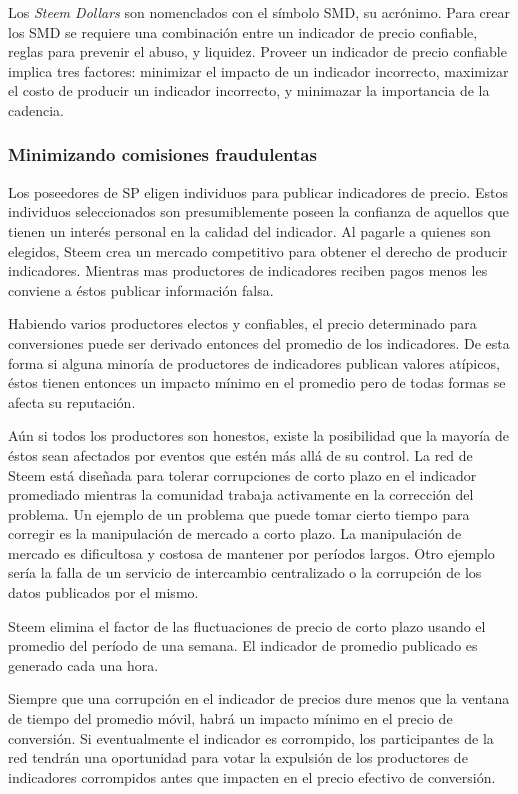 \documentclass[a4paper,titlepage,final]{article}
\begin{document}
Los \textit{Steem Dollars} son nomenclados con el símbolo SMD, su acrónimo. Para crear los SMD se requiere una combinación entre un indicador de precio confiable, reglas para prevenir el abuso, y liquidez. Proveer un indicador de precio confiable implica tres factores: minimizar el impacto de un indicador incorrecto, maximizar el costo de producir un indicador incorrecto, y minimazar la importancia de la cadencia.

\subsubsection{Minimizando comisiones fraudulentas}

Los poseedores de SP eligen individuos para publicar indicadores de precio. Estos individuos seleccionados son presumiblemente poseen la confianza de aquellos que tienen un interés personal en la calidad del indicador. Al pagarle a quienes son elegidos, Steem crea un mercado competitivo para obtener el derecho de producir indicadores. Mientras mas productores de indicadores reciben pagos menos les conviene a éstos publicar información falsa.

Habiendo varios productores electos y confiables, el precio determinado para conversiones puede ser derivado entonces del promedio de los indicadores. De esta forma si alguna minoría de productores de indicadores publican valores atípicos, éstos tienen entonces un impacto mínimo en el promedio pero de todas formas se afecta su reputación.

Aún si todos los productores son honestos, existe la posibilidad que la mayoría de éstos sean afectados por eventos que estén más allá de su control. La red de Steem está diseñada para tolerar corrupciones de corto plazo en el indicador promediado mientras la comunidad trabaja activamente en la corrección del problema. Un ejemplo de un problema que puede tomar cierto tiempo para corregir es la manipulación de mercado a corto plazo. La manipulación de mercado es dificultosa y costosa de mantener por períodos largos. Otro ejemplo sería la falla de un servicio de intercambio centralizado o la corrupción de los datos publicados por el mismo.

Steem elimina el factor de las fluctuaciones de precio de corto plazo usando el promedio del período de una semana. El indicador de promedio publicado es generado cada una hora.

Siempre que una corrupción en el indicador de precios dure menos que la ventana de tiempo del promedio móvil, habrá un impacto mínimo en el precio de conversión. Si eventualmente el indicador es corrompido, los participantes de la red tendrán una oportunidad para votar la expulsión de los productores de indicadores corrompidos antes que impacten en el precio efectivo de conversión.
\end{document}
